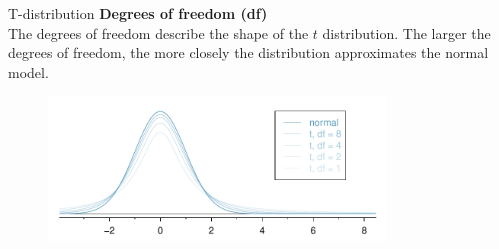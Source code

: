 \documentclass[12pt,a4paper]{beamer}
\begin{document}
\begin{frame}{T-distribution}
	\textbf{Degrees of freedom (df)}\\
	The degrees of freedom describe the shape of the $t$ distribution. The larger the degrees of freedom, the more closely the distribution approximates the normal model.
	\begin{figure}
	\centering
	\includegraphics[width=0.8\textwidth]{figures/tDistConvergeToNormalDist/tDistConvergeToNormalDist}
	\end{figure}
\end{frame}
\end{document}
